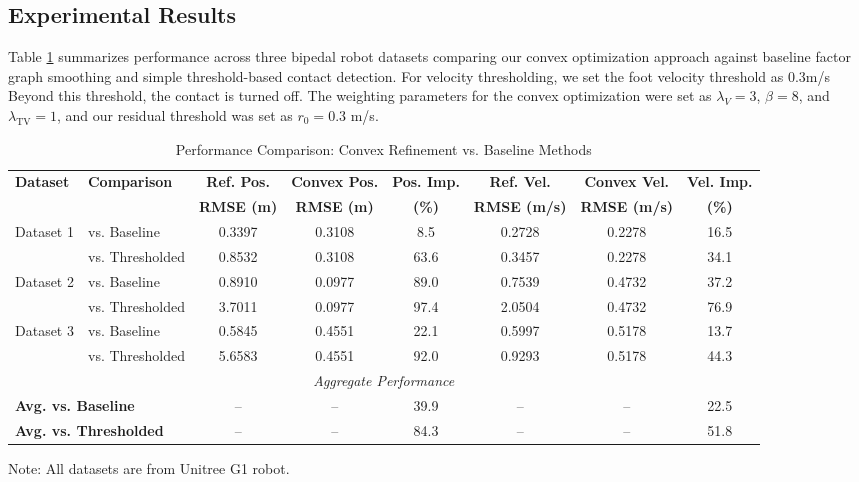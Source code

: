 \documentclass[conference]{IEEEtran}
\begin{document}
\subsection{Experimental Results}
Table \ref{tab:comparison} summarizes performance across three bipedal robot datasets comparing our convex optimization approach against baseline factor graph smoothing and simple threshold-based contact detection.
For velocity thresholding, we set the foot velocity threshold as 0.3m/s Beyond this 
threshold, the contact is turned off.
The weighting parameters for the convex optimization were set as $\lambda_V = 3$, $\beta = 8$, and $\lambda_{\text{TV}} = 1$, and our
residual threshold was set as $r_0 = 0.3$ m/s.
\begin{table}[htbp]
\caption{Performance Comparison: Convex Refinement vs. Baseline Methods}
\begin{center}
\small
\begin{tabular}{llcccccc}
\toprule
\textbf{Dataset} & \textbf{Comparison} & \textbf{Ref. Pos.} & \textbf{Convex Pos.} & \textbf{Pos. Imp.} & \textbf{Ref. Vel.} & \textbf{Convex Vel.} & \textbf{Vel. Imp.} \\
 & & \textbf{RMSE (m)} & \textbf{RMSE (m)} & \textbf{(\%)} & \textbf{RMSE (m/s)} & \textbf{RMSE (m/s)} & \textbf{(\%)} \\
\midrule
\multirow{2}{*}{Dataset 1} 
    & vs. Baseline & 0.3397 & 0.3108 & 8.5 & 0.2728 & 0.2278 & 16.5 \\
    & vs. Thresholded & 0.8532 & 0.3108 & 63.6 & 0.3457 & 0.2278 & 34.1 \\
\midrule
\multirow{2}{*}{Dataset 2} 
    & vs. Baseline & 0.8910 & 0.0977 & 89.0 & 0.7539 & 0.4732 & 37.2 \\
    & vs. Thresholded & 3.7011 & 0.0977 & 97.4 & 2.0504 & 0.4732 & 76.9 \\
\midrule
\multirow{2}{*}{Dataset 3} 
    & vs. Baseline & 0.5845 & 0.4551 & 22.1 & 0.5997 & 0.5178 & 13.7 \\
    & vs. Thresholded & 5.6583 & 0.4551 & 92.0 & 0.9293 & 0.5178 & 44.3 \\
\midrule
\midrule
\multicolumn{8}{c}{\textit{Aggregate Performance}} \\
\midrule
\multicolumn{2}{l}{\textbf{Avg. vs. Baseline}} & -- & -- & 39.9 & -- & -- & 22.5 \\
\multicolumn{2}{l}{\textbf{Avg. vs. Thresholded}} & -- & -- & 84.3 & -- & -- & 51.8 \\
\bottomrule
\end{tabular}
\label{tab:comparison}
\end{center}
\vspace{-0.1cm}
\footnotesize
Note: All datasets are from Unitree G1 robot.
\end{table}
\end{document}
